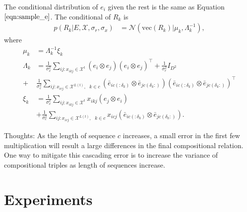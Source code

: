 \documentclass{article}
\begin{document}
The conditional distribution of $e_i$ given the rest is the same as Equation $\ref{eqn:sample_e}$. The conditional of $R_k$ is
\begin{align}
p(R_k|E, \mathcal{X}, \sigma_r, \sigma_x)  &= \mathcal{N}(\text{vec}(R_k) | \mu_k, \Lambda_k^{-1}),
\end{align}
where
\begin{align*}
\mu_k &= \Lambda_k^{-1}\xi_k \\
\Lambda_k &= \frac{1}{\sigma_x^2} \sum_{ij:x_{ikj} \in \mathcal{X}^{t}} (e_i \otimes e_j)(e_i \otimes e_j)^\top + \frac{1}{\sigma_r^2} {I}_{D^2} \\
+ &\frac{1}{\sigma_c^2} \sum_{ij:x_{icj} \in \mathcal{X}^{L(t)}, \text{ }k \in c} (\bar{e}_{ic(:\delta_k)} \otimes \bar{e}_{jc(\delta_k:)})(\bar{e}_{ic(:\delta_k)} \otimes \bar{e}_{jc(\delta_k:)} )^\top \\
\xi_k &= \frac{1}{\sigma_x^2} \sum_{ij:x_{ikj} \in \mathcal{X}^{t}} x_{ikj} (e_{j} \otimes e_{i}) \\
& + \frac{1}{\sigma_c^2} \sum_{ij:x_{icj} \in \mathcal{X}^{L(t)}, \text{ }k\in c} x_{icj} (\bar{e}_{ic(:\delta_k)}  \otimes \bar{e}_{jc(\delta_k:)}).
\end{align*}


Thoughts: As the length of sequence $c$ increases, a small error in the first few multiplication will result a large differences in the final compositional relation. One way to mitigate this cascading error is to increase the variance of compositional triples as length of sequences increase.

\section{Experiments}
\end{document}

